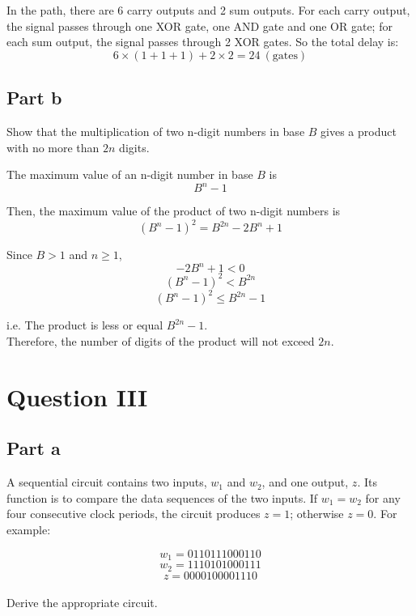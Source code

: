 \documentclass[12pt, a4paper]{article}
\begin{document}
	In the path, there are 6 carry outputs and 2 sum outputs. For each carry output, the signal passes through one XOR gate, one AND gate and one OR gate; for each sum output, the signal passes through 2 XOR gates. So the total delay is:
	$$6 \times (1 + 1 + 1) + 2 \times 2 = 24\ (\text{gates})$$
	
	\subsection*{Part b}
	Show that the multiplication of two n-digit numbers in base $B$ gives a product with no more than $2n$ digits.
	
	The maximum value of an n-digit number in base $B$ is
		$$B ^ n - 1$$
	
	Then, the maximum value of the product of two n-digit numbers is
		$$(B ^ n - 1) ^ 2 = B ^ {2n} - 2B^n + 1$$ 

	Since $B > 1$ and $n \ge 1$,
		$$-2B ^ n + 1 < 0$$
		$$(B ^ n - 1) ^ 2 < B ^ {2n}$$
		$$(B ^ n - 1) ^ 2 \le B ^ {2n} - 1$$
	
	i.e. The product is less or equal $B ^ {2n} - 1$.
	\\
	
	Therefore, the number of digits of the product will not exceed $2n$.

	\section*{Question III}
	\subsection*{Part a}
	A sequential circuit contains two inputs, $w_1$ and $w_2$, and one output, $z$. Its function is to compare the data sequences of the two inputs. If $w_1 = w_2$ for any four consecutive clock periods, the circuit produces $z = 1$; otherwise $z = 0$. For example:
	
	$$w_1 = 0110111000110$$
	$$w_2 = 1110101000111$$
	$$z = 0000100001110$$
	\\
	Derive the appropriate circuit.
	\\
	
\end{document}
